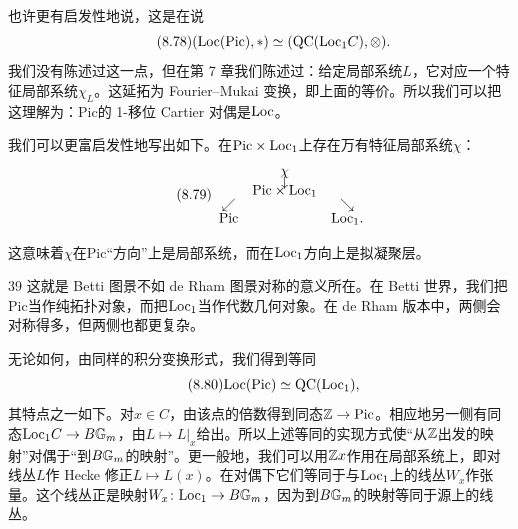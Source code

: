 也许更有启发性地说，这是在说
\begin{equation}\tag{8.78}
(\mathrm{Loc}(\mathrm{Pic}),*)\simeq(\mathrm{QC}(\mathrm{Loc}_1 C),\otimes).
\end{equation}
我们没有陈述过这一点，但在第 7 章我们陈述过：给定局部系统$L$，它对应一个特征局部系统$\chi_L$。这延拓为 Fourier--Mukai 变换，即上面的等价。所以我们可以把这理解为：$\mathrm{Pic}$的 1-移位 Cartier 对偶是$\mathrm{Loc}$。

我们可以更富启发性地写出如下。在$\mathrm{Pic}\times\mathrm{Loc}_1$上存在万有特征局部系统$\chi$：
\begin{equation}\tag{8.79}
\begin{array}{ccc}
 & \chi &\\[-4pt]
 & \downarrow &\\[-6pt]
 & \mathrm{Pic}\times\mathrm{Loc}_1 &\\[-2pt]
 \swarrow & & \searrow\\[-2pt]
 \mathrm{Pic} & & \mathrm{Loc}_1.
\end{array}
\end{equation}

这意味着$\chi$在$\mathrm{Pic}$“方向”上是局部系统，而在$\mathrm{Loc}_1$方向上是拟凝聚层。

\begin{srcrem}{39}
这就是 Betti 图景不如 de Rham 图景对称的意义所在。在 Betti 世界，我们把$\mathrm{Pic}$当作纯拓扑对象，而把$\mathrm{Loc}_1$当作代数几何对象。在 de Rham 版本中，两侧会对称得多，但两侧也都更复杂。
\end{srcrem}

无论如何，由同样的积分变换形式，我们得到等同
\begin{equation}\tag{8.80}
\mathrm{Loc}(\mathrm{Pic})\simeq\mathrm{QC}(\mathrm{Loc}_1),
\end{equation}
其特点之一如下。对$x\in C$，由该点的倍数得到同态$\mathbb{Z}\to\mathrm{Pic}$。相应地另一侧有同态$\mathrm{Loc}_1 C\to B\mathbb{G}_m$，由$L\mapsto L|_x$给出。所以上述等同的实现方式使“从$\mathbb{Z}$出发的映射”对偶于“到$B\mathbb{G}_m$的映射”。更一般地，我们可以用$\mathbb{Z} x$作用在局部系统上，即对线丛$L$作 Hecke 修正$L\mapsto L(x)$。在对偶下它们等同于与$\mathrm{Loc}_1$上的线丛$W_x$作张量。这个线丛正是映射$W_x\colon\mathrm{Loc}_1\to B\mathbb{G}_m$，因为到$B\mathbb{G}_m$的映射等同于源上的线丛。

